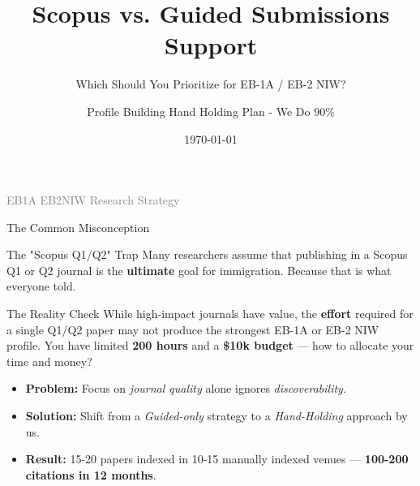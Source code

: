 \documentclass[10pt, aspectratio=169]{beamer}
\title[Publication Strategy for EB-1A/NIW]{\textbf{Scopus vs. Guided Submissions Support}}
\subtitle{Which Should You Prioritize for EB-1A / EB-2 NIW?}
\author[Profile Building]{Profile Building Hand Holding Plan - We Do 90\%}
\institute[EB1A Course]{EB1A Profile Building Strategy Course by Shivgan Joshi}
\date{\today}
\begin{document}
	
	\begin{frame}
		\titlepage
		\begin{center}
			\tiny{\textcolor{gray}{EB1A EB2NIW Research Strategy}}
		\end{center}
	\end{frame}
	
	\begin{frame}{The Common Misconception}
		\begin{block}{The "Scopus Q1/Q2" Trap}
			Many researchers assume that publishing in a Scopus Q1 or Q2 journal is the \textbf{ultimate} goal for immigration. Because that is what everyone told.
		\end{block}
		\vspace{0.5cm}
		\begin{alertblock}{The Reality Check}
			While high-impact journals have value, the \textbf{effort} required for a single Q1/Q2 paper may not produce the strongest EB-1A or EB-2 NIW profile. You have limited \textbf{200 hours} and a \textbf{\$10k budget} — how to allocate your time and money?
		\end{alertblock}
		\vspace{0.3cm}
		\begin{itemize}
			\item \textbf{Problem:} Focus on \textit{journal quality} alone ignores \textit{discoverability}.
			\item \textbf{Solution:} Shift from a \textit{Guided-only} strategy to a \textit{Hand-Holding} approach by us.
			\item \textcolor{myblue}{\textbf{Result:}} 15-20 papers indexed in 10-15 manually indexed venues — \textbf{100-200 citations in 12 months}.
		\end{itemize}
	\end{frame}
	
\end{document}
